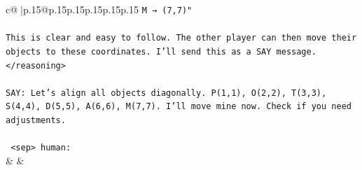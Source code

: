 \documentclass{article}
\begin{document}
{\begin{supertabular}{c@{$\;$}|p{.15\linewidth}@{}p{.15\linewidth}p{.15\linewidth}p{.15\linewidth}p{.15\linewidth}p{.15\linewidth}}
{{{\texttt{M → (7,7)"} \\
\\ 
\texttt{This is clear and easy to follow. The other player can then move their objects to these coordinates. I'll send this as a SAY message.} \\
\texttt{</reasoning>} \\
\\ 
\texttt{SAY: Let's align all objects diagonally. P(1,1), O(2,2), T(3,3), S(4,4), D(5,5), A(6,6), M(7,7). I'll move mine now. Check if you need adjustments.} \\
\\ 
\texttt{ <sep> human:} \\
            }
        }
    }
    & & \\ \\


\end{supertabular}}
\end{document}
